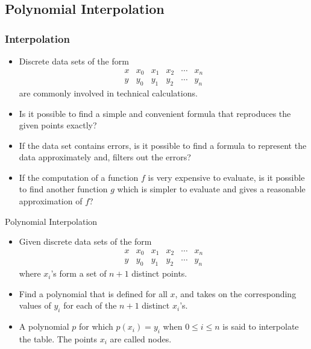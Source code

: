 \documentclass{beamer}
\begin{document}
\subsection[Polynomial Interpolation]{Polynomial Interpolation}
\begin{frame}[fragile]
\frametitle{Interpolation}
\begin{itemize}
\item Discrete data sets of the form 
\[\begin{array}{c||c|c|c|c|c}
x & x_0 & x_1 & x_2 & \cdots & x_n\\
\hline
y & y_0 & y_1 & y_2 & \cdots & y_n
\end{array}
\]
are commonly involved in technical calculations.
\item Is it possible to find a \alert{simple} and \alert{convenient} formula that reproduces the given points exactly?
\item If the data set contains errors, is it possible to  find a formula to \alert{represent the data approximately} and, filters out the errors?
\item If the computation of a function $f$ is very \alert{expensive to evaluate}, is it possible to find another function $g$ which is simpler to evaluate and gives a reasonable approximation of $f$?
\end{itemize}
\end{frame}
\begin{frame}{Polynomial Interpolation}
\begin{itemize}
\item Given discrete data sets of the form 
\[\begin{array}{c||c|c|c|c|c}
x & x_0 & x_1 & x_2 & \cdots & x_n\\
\hline
y & y_0 & y_1 & y_2 & \cdots & y_n
\end{array}
\]
where $x_i$'s form a set of $n+1$ distinct points.
\item Find a polynomial that is defined for all $x$, and takes on the corresponding values of $y_i$ for each of the $n+1$
distinct $x_i$'s.
\item A polynomial $p$ for which $p(x_i) = y_i$ when $0 \le i \le n$ is said to interpolate the table. The points $x_i$ are called \alert{nodes}.
\end{itemize}
\end{frame}
\end{document}
